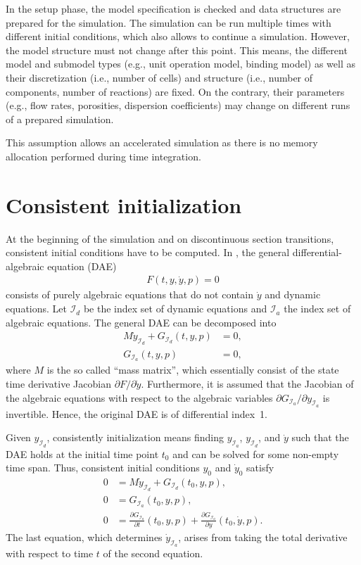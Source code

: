 In the setup phase, the model specification is checked and data structures are prepared for the simulation.
The simulation can be run multiple times with different initial conditions, which also allows to continue a simulation.
However, the model structure must not change after this point.
This means, the different model and submodel types (e.g., unit operation model, binding model) as well as their discretization (i.e., number of cells) and structure (i.e., number of components, number of reactions) are fixed.
On the contrary, their parameters (e.g., flow rates, porosities, dispersion coefficients) may change on different runs of a prepared simulation.

This assumption allows an accelerated simulation as there is no memory allocation performed during time integration.

\section{Consistent initialization}\label{sec:SimConsistentInit}

At the beginning of the simulation and on discontinuous section transitions, consistent initial conditions have to be computed. 
In \CADET{}, the general differential-algebraic equation (DAE)
\begin{align*}
	F(t, y, \dot{y}, p) = 0
\end{align*}
consists of purely algebraic equations that do not contain $\dot{y}$ and dynamic equations.
Let $\mathcal{I}_d$ be the index set of dynamic equations and $\mathcal{I}_a$ the index set of algebraic equations.
The general DAE can be decomposed into
\begin{align}
	M \dot{y}_{\mathcal{I}_d} + G_{\mathcal{I}_d}(t, y, p) &= 0, \\
	G_{\mathcal{I}_a}(t, y, p) &= 0,
\end{align}
where $M$ is the so called ``mass matrix'', which essentially consist of the state time derivative Jacobian $\partial F / \partial \dot{y}$.
Furthermore, it is assumed that the Jacobian of the algebraic equations with respect to the algebraic variables $\partial G_{\mathcal{I}_a} / \partial y_{\mathcal{I}_a}$ is invertible.
Hence, the original DAE is of differential index~1.

Given $y_{\mathcal{I}_d}$, consistently initialization means finding $y_{\mathcal{I}_a}$, $y_{\mathcal{I}_d}$, and $\dot{y}$ such that the DAE holds at the initial time point $t_0$ and can be solved for some non-empty time span.
Thus, consistent initial conditions $y_0$ and $\dot{y}_0$ satisfy
\begin{align*}
	0 &= M \dot{y}_{\mathcal{I}_d} + G_{\mathcal{I}_d}\left(t_0, y, p\right), \\
	0 &= G_{\mathcal{I}_a}\left(t_0, y, p\right), \\
	0 &= \frac{\partial G_{\mathcal{I}_a}}{\partial t}\left(t_0, y, p\right) + \frac{\partial G_{\mathcal{I}_a}}{\partial y}\left(t_0, \dot{y}, p\right).
\end{align*}
The last equation, which determines $\dot{y}_{\mathcal{I}_a}$, arises from taking the total derivative with respect to time $t$ of the second equation.

